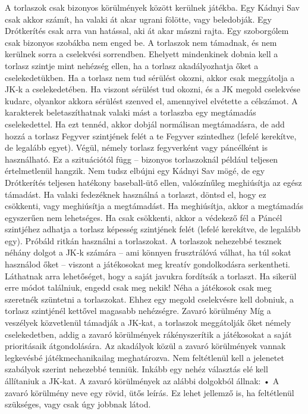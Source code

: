 \documentclass[oneside]{book}
\begin{document}
A torlaszok csak bizonyos körülmények között kerülnek játékba. Egy Kádnyi Sav csak akkor számít, ha valaki át akar ugrani fölötte, vagy beledobják. Egy Drótkerítés csak arra van hatással, aki át akar mászni rajta. Egy szoborgólem csak bizonyos szobákba nem enged be.
A torlaszok nem támadnak, és nem kerülnek sorra a cselekvési sorrendben. Ehelyett mindenkinek dobnia kell a torlasz szintje mint nehézség ellen, ha a torlasz akadályozhatja őket a cselekedetükben. Ha a torlasz nem tud sérülést okozni, akkor csak meggátolja a JK‑k a cselekedetében. Ha viszont sérülést tud okozni, és a JK megold cselekvése kudarc, olyankor akkora sérülést szenved el, amennyivel elvétette a célszámot.
A karakterek beletaszíthatnak valaki mást a torlaszba egy megtámadás cselekedettel. Ha ezt tennéd, akkor dobjál normálisan megtámadásra, de add hozzá a torlasz Fegyver szintjének felét a te Fegyver szintedhez (lefelé kerekítve, de legalább egyet).
Végül, némely torlasz fegyverként vagy páncélként is használható. Ez a szituációtól függ – bizonyos torlaszoknál például teljesen értelmetlenül hangzik. Nem tudsz elbújni egy Kádnyi Sav mögé, de egy  Drótkerítés teljesen hatékony baseball‑ütő ellen, valószínűleg meghiúsítja az egész támadást.
Ha valaki fedezéknek használná a torlaszt, döntsd el, hogy ez csökkenti, vagy meghiúsítja a megtámadást. Ha meghiúsítja, akkor a megtámadás egyszerűen nem lehetséges. Ha csak csökkenti, akkor a védekező fél a Páncél szintjéhez adhatja a torlasz képesség szintjének felét (lefelé kerekítve, de legalább egy).
Próbáld ritkán használni a torlaszokat. A torlaszok nehezebbé tesznek néhány dolgot a JK‑k számára – ami könnyen frusztrálóvá válhat, ha túl sokat használod őket – viszont a játékosokat meg kreatív gondolkodásra serkentheti. Láthatnak arra lehetőséget, hogy a saját javukra fordítsák a torlaszt. Ha sikerül erre módot találniuk, engedd csak meg nekik!
Néha a játékosok csak meg szeretnék szüntetni a torlaszokat. Ehhez egy megold cselekvésre kell dobniuk, a torlasz szintjénél kettővel magasabb nehézségre.
Zavaró körülmény
Míg a veszélyek közvetlenül támadják a JK‑kat, a torlaszok meggátolják őket némely cselekedetben, addig a zavaró körülmények rákényszerítik a játékosokat a saját prioritásaik átgondolására. Az akadályok közül a zavaró körülmények vannak legkevésbé játékmechanikailag meghatározva. Nem feltétlenül kell a jelenetet szabályok szerint nehezebbé tenniük. Inkább egy nehéz választás elé kell állítaniuk a JK‑kat. A zavaró körülmények az alábbi dolgokból állnak:
    • A zavaró körülmény neve egy rövid, ütős leírás. Ez lehet jellemző is, ha feltétlenül szükséges, vagy csak úgy jobbnak látod.
\end{document}
